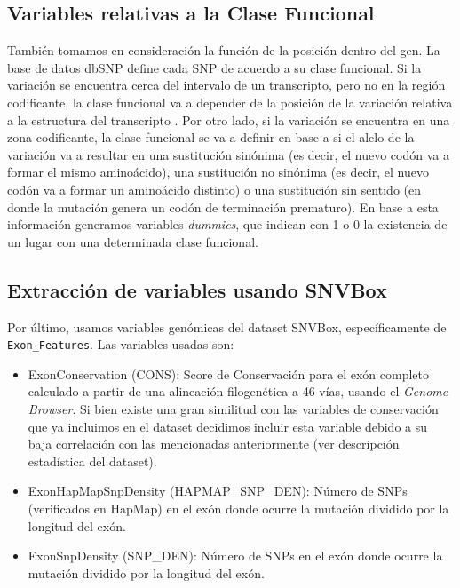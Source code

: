 \subsection{Variables relativas a la Clase Funcional}

También tomamos en consideración la función de la posición dentro del gen. La base de datos dbSNP define cada SNP de acuerdo a su clase funcional. Si la variación se encuentra cerca del intervalo de un transcripto, pero no en la región codificante, la clase funcional va a depender de la posición de la variación relativa a la estructura del transcripto \cite{Ostell2007}.  Por otro lado, si la variación se encuentra en una zona codificante, la clase funcional se va a definir en base a si el alelo de la variación va a resultar en una sustitución sinónima (es decir, el nuevo codón va a formar el mismo aminoácido), una sustitución no sinónima (es decir, el nuevo codón va a formar un aminoácido distinto) o una sustitución sin sentido (en donde la mutación genera un codón de terminación prematuro). En base a esta información generamos variables \textit{dummies}, que indican con 1 o 0 la existencia de un lugar con una determinada clase funcional.


 

\subsection{Extracción de variables usando SNVBox}

Por último, usamos variables genómicas del dataset SNVBox, específicamente de \texttt{Exon\_Features}. 
Las variables usadas son:
\begin{itemize}
    \item ExonConservation (CONS): Score de Conservación para el exón completo calculado a partir de una alineación filogenética a 46 vías, usando el \textit{Genome Browser}. Si bien existe una gran similitud con las variables de conservación que ya incluimos en el dataset decidimos incluir esta variable debido a su baja correlación con las mencionadas anteriormente (ver descripción estadística del dataset).
    \item ExonHapMapSnpDensity (HAPMAP\_SNP\_DEN): Número de SNPs (verificados en HapMap) en el exón donde ocurre la mutación dividido por la longitud del exón.
    \item ExonSnpDensity (SNP\_DEN): Número de SNPs en el exón donde ocurre la mutación dividido por la longitud del exón.
\end{itemize}

